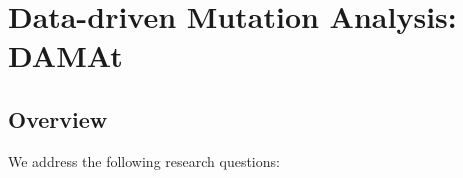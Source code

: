 \clearpage
\section{Data-driven Mutation Analysis: DAMAt}

\renewcommand{\APPR}{\textit{DAMAt}\xspace}

\subsection{Overview}

We address the following research questions:

%
%
%
%
